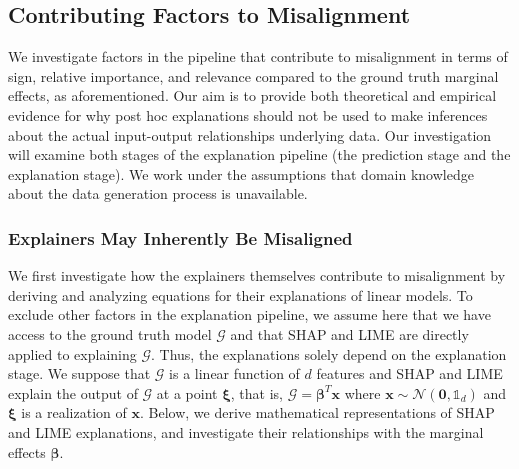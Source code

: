 \documentclass[mnsc,blindrev]{informs3}
\begin{document}
    \subsection{Contributing Factors to  Misalignment}
        \label{sec:causes_of_misalignment}
        We investigate factors in the pipeline that contribute to misalignment in terms of sign, relative importance, and relevance compared to the ground truth marginal effects, as aforementioned. Our aim is to provide both theoretical and empirical evidence for why post hoc explanations should not be used to make inferences about the actual input-output relationships underlying data. Our investigation will examine both stages of the explanation pipeline (the prediction stage and the explanation stage). %
        We work under the assumptions that domain knowledge about the data generation process is unavailable. %


    \subsubsection{Explainers May Inherently Be Misaligned}
    \label{sec:theoretical_considerations}
   We first investigate how the explainers themselves contribute to misalignment by deriving and analyzing equations for their explanations of linear models. To exclude other factors in the explanation pipeline, we assume here that we have access to the ground truth model $\mathcal{G}$ and that SHAP and LIME are directly applied to explaining $\mathcal{G}$. Thus, the explanations solely depend on the explanation stage. We suppose that $\mathcal{G}$ is a linear function of $d$ features and SHAP and LIME explain the output of $\mathcal{G}$ at a point $\boldsymbol{\xi}$, that is, $\mathcal{G} = \boldsymbol{\beta}^T \mathbf{x}$ where $\mathbf{x} \sim \mathcal{N}(\mathbf{0},\mathds{1}_d)$ and $\boldsymbol{\xi}$ is a realization of $\mathbf{x}$. Below, we derive mathematical representations of SHAP and LIME explanations, and investigate their relationships with the marginal effects $\boldsymbol{\beta}$.
\end{document}
